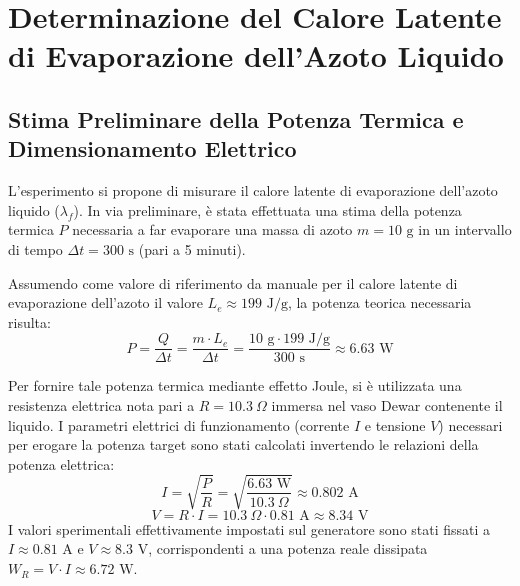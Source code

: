 \documentclass[a4paper,12pt]{article}
\begin{document}
\section{Determinazione del Calore Latente di Evaporazione dell'Azoto Liquido}

\subsection{Stima Preliminare della Potenza Termica e Dimensionamento Elettrico}
L'esperimento si propone di misurare il calore latente di evaporazione dell'azoto liquido ($\lambda_f$). In via preliminare, è stata effettuata una stima della potenza termica $P$ necessaria a far evaporare una massa di azoto $m = 10\text{ g}$ in un intervallo di tempo $\Delta t = 300\text{ s}$ (pari a 5 minuti). 

Assumendo come valore di riferimento da manuale per il calore latente di evaporazione dell'azoto il valore $L_e \approx 199\text{ J/g}$, la potenza teorica necessaria risulta:
\begin{equation*}
P = \frac{Q}{\Delta t} = \frac{m \cdot L_e}{\Delta t} = \frac{10\text{ g} \cdot 199\text{ J/g}}{300\text{ s}} \approx 6.63\text{ W}
\end{equation*}

Per fornire tale potenza termica mediante effetto Joule, si è utilizzata una resistenza elettrica nota pari a $R = 10.3\ \Omega$ immersa nel vaso Dewar contenente il liquido. I parametri elettrici di funzionamento (corrente $I$ e tensione $V$) necessari per erogare la potenza target sono stati calcolati invertendo le relazioni della potenza elettrica:
\begin{equation*}
I = \sqrt{\frac{P}{R}} = \sqrt{\frac{6.63\text{ W}}{10.3\ \Omega}} \approx 0.802\text{ A}
\end{equation*}
\begin{equation*}
V = R \cdot I = 10.3\ \Omega \cdot 0.81\text{ A} \approx 8.34\text{ V}
\end{equation*}
I valori sperimentali effettivamente impostati sul generatore sono stati fissati a $I \approx 0.81\text{ A}$ e $V \approx 8.3\text{ V}$, corrispondenti a una potenza reale dissipata $W_R = V \cdot I \approx 6.72\text{ W}$.
\end{document}
